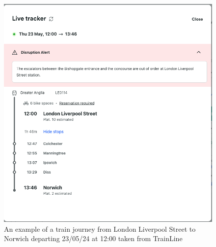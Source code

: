 \begin{figure}[!htbp]
    \centering
    \includegraphics[width=\textwidth]{Diagrams/LLM examples/Trainline_LND_NRW.png}
    \caption{An example of a train journey from London Liverpool Street to Norwich departing 23/05/24 at 12:00 taken from TrainLine}
    \label{Fig: Trainline example LDN to NRW}
\end{figure}

